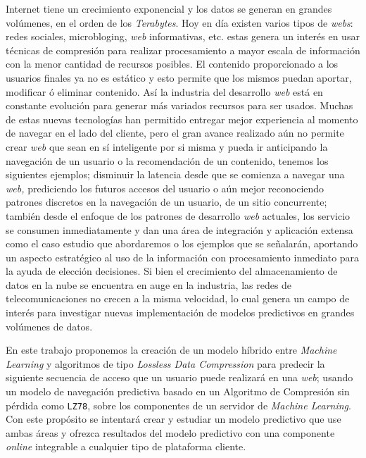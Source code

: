 
Internet tiene un crecimiento exponencial  y los datos se generan en grandes volúmenes, en el orden de los \emph{Terabytes}. Hoy en día existen varios tipos de \emph{webs}: redes sociales, microbloging, \emph{web} informativas, etc. estas genera un interés en usar técnicas de compresión para realizar procesamiento a mayor escala de información con la menor cantidad de recursos posibles. El contenido proporcionado a los usuarios finales ya no es estático y esto permite que los mismos puedan  aportar, modificar ó eliminar contenido. Así  la industria del desarrollo \emph{web} está en constante evolución para generar más variados recursos para ser usados. Muchas de estas nuevas tecnologías han permitido entregar mejor experiencia al momento de navegar en el lado del cliente, pero el gran avance realizado aún no permite crear \emph{web} que sean en sí inteligente por si misma y pueda ir anticipando la  navegación de un usuario o la recomendación de un contenido, tenemos los siguientes ejemplos; disminuir la latencia desde que se comienza a navegar una \emph{web,} prediciendo los futuros accesos del usuario o aún mejor reconociendo patrones discretos en la navegación de un usuario,  de un sitio concurrente; también desde el enfoque de los patrones de desarrollo \emph{web} actuales, los servicio  se consumen inmediatamente y dan una área de integración y  aplicación extensa como el caso estudio que abordaremos o los ejemplos que se señalarán, aportando un aspecto estratégico al uso de la información con procesamiento inmediato para la ayuda de elección decisiones.
Si bien el crecimiento del almacenamiento de datos en la nube se encuentra en auge en la industria, las redes de telecomunicaciones  no crecen a la misma velocidad, lo cual genera un campo de interés para investigar nuevas implementación de modelos predictivos en grandes volúmenes de datos. 

En este trabajo proponemos  la creación de un modelo híbrido entre \emph{Machine Learning} y algoritmos de tipo \emph{Lossless Data Compression} para predecir la siguiente secuencia de acceso que un usuario puede realizará en una \emph{web}; usando un modelo de navegación predictiva basado en un Algoritmo de Compresión sin pérdida como \texttt{LZ78}, sobre los componentes de un servidor de \emph{Machine Learning}. Con este propósito se intentará crear y estudiar un modelo predictivo que use ambas áreas y  ofrezca resultados del modelo predictivo con una componente \emph{online} integrable a cualquier tipo de plataforma cliente.